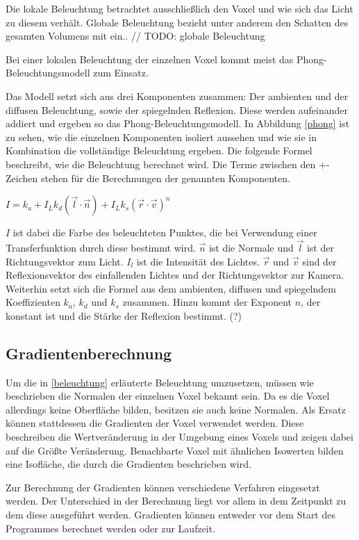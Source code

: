 Die lokale Beleuchtung betrachtet ausschließlich den Voxel und wie sich das Licht zu diesem verhält. 
Globale Beleuchtung bezieht unter anderem den Schatten des gesamten Volumens mit ein..
// TODO:
globale Beleuchtung

Bei einer lokalen Beleuchtung der einzelnen Voxel kommt meist das Phong-Beleuchtungsmodell zum Einsatz. 

Das Modell setzt sich aus drei Komponenten zusammen: Der ambienten und der diffusen Beleuchtung, sowie der spiegelnden Reflexion. Diese werden aufeinander addiert und ergeben so das Phong-Beleuchtungsmodell.  In Abbildung \ref{phong} ist zu sehen, wie die einzelnen Komponenten isoliert aussehen und wie sie in Kombination die vollständige Beleuchtung ergeben.
Die folgende Formel beschreibt, wie die Beleuchtung berechnet wird. Die Terme zwischen den $+$-Zeichen stehen für die Berechnungen der genannten Komponenten.

$I = k_{a}+I_{L}k_{d}(\vec{l}\cdot\vec{n})+I_{L}k_{s}(\vec{r}\cdot\vec{v})^n$

$I$ ist dabei die Farbe des beleuchteten Punktes, die bei Verwendung einer Transferfunktion durch diese bestimmt wird. $\vec{n}$ ist die Normale und $\vec{l}$ ist der Richtungsvektor zum Licht. $I_{l}$ ist die Intensität des Lichtes. $\vec{r}$ und $\vec{v}$ sind der Reflexionsvektor des einfallenden Lichtes und der Richtungsvektor zur Kamera. Weiterhin setzt sich die Formel aus dem ambienten, diffusen und spiegelndem Koeffizienten $k_{a}$, $k_{d}$ und $k_{s}$ zusammen. Hinzu kommt der Exponent $n$, der konstant ist und die Stärke der Reflexion bestimmt. (?)

\subsection{Gradientenberechnung}

Um die in \ref{beleuchtung} erläuterte Beleuchtung umzusetzen, müssen wie beschrieben die Normalen der einzelnen Voxel bekannt sein. Da es die Voxel allerdings keine Oberfläche bilden, besitzen sie auch keine Normalen. Als Ersatz können stattdessen die Gradienten der Voxel verwendet werden. Diese beschreiben die Wertveränderung in der Umgebung eines Voxels und zeigen dabei auf die Größte Veränderung. Benachbarte Voxel mit ähnlichen Isowerten bilden eine Isofläche, die durch die Gradienten beschrieben wird. 

Zur Berechnung der Gradienten können verschiedene Verfahren eingesetzt werden. Der Unterschied in der Berechnung liegt vor allem in dem Zeitpunkt zu dem diese ausgeführt werden. Gradienten können entweder vor dem Start des Programmes berechnet werden oder zur Laufzeit. 

